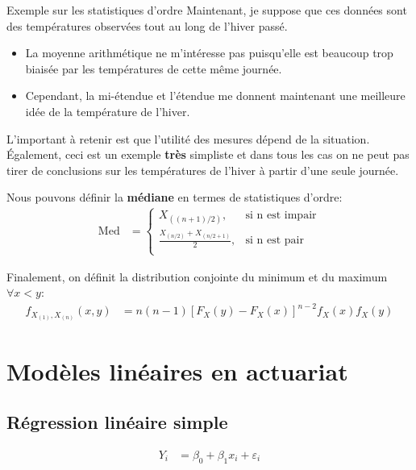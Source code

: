 \documentclass[10pt, french]{article}
\begin{document}
\begin{multicols*}{2}
\begin{conceptgen}{Exemple sur les statistiques d'ordre}
Maintenant, je suppose que ces données sont des températures observées tout au long de l'hiver passé.
\begin{itemize}[leftmargin = *]
	\item	La moyenne arithmétique ne m'intéresse pas puisqu'elle est beaucoup trop biaisée par les températures de cette même journée. 
	\item	Cependant, la mi-étendue et l'étendue me donnent maintenant une meilleure idée de la température de l'hiver.
\end{itemize}

L'important à retenir est que l'utilité des mesures dépend de la situation. Également, ceci est un exemple \textbf{très} simpliste et dans tous les cas on ne peut pas tirer de conclusions sur les températures de l'hiver à partir d'une seule journée.
\end{conceptgen}

Nous pouvons définir la \textbf{médiane} en termes de statistiques d'ordre:
\begin{align*}
	\text{Med}
	&=	\left\{
		\begin{matrix}
			X_{((n + 1)/2)},		&	\text{si n est impair}	\\
			\frac{X_{(n/2)} + X_{(n/2 + 1)}}{2},	&	\text{si n est pair}	\\
		\end{matrix}
	\right.
\end{align*}

Finalement, on définit la distribution conjointe du minimum et du maximum $\forall x < y$:
\begin{align*}
	f_{X_{(1)}, X_{(n)}}(x, y)
	&=	n (n - 1) [F_{X}(y) - F_{X}(x)]^{n - 2} f_{X}(x) f_{X}(y)
\end{align*}

\pagebreak

\section*{Modèles linéaires en actuariat}

\subsection*{Régression linéaire simple}

\begin{definitionNOHFILL}
\begin{align*}
	Y_{i} 
	&=	\beta_{0} + \beta_{1} x_{i} + \varepsilon_{i}
\end{align*}
\end{definitionNOHFILL}


\end{multicols*}
\end{document}
